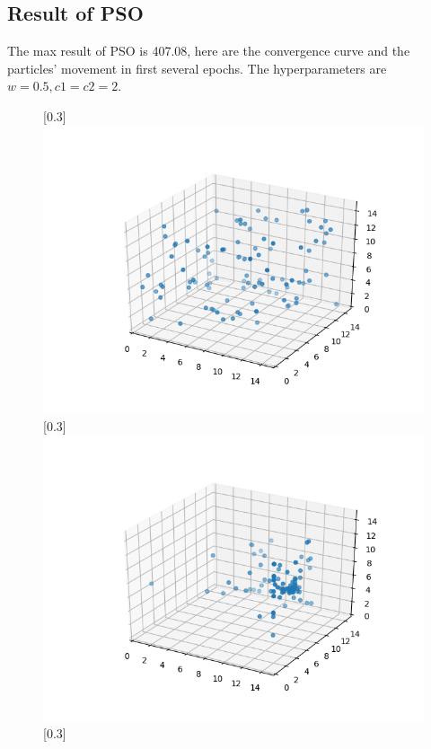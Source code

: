 \documentclass[11pt]{article} %
\begin{document}
\subsection{Result of PSO}
The max result of PSO is 407.08, here are the convergence curve and the particles' movement in first several epochs. The hyperparameters are $w = 0.5, c1=c2=2$.
\begin{figure}[ht]
		\centering
	[0.3\linewidth]{
		\includegraphics[scale=0.3]{PSO01.png}
	}
	[0.3\linewidth]{
		\includegraphics[scale=0.3]{PSO02.png}
	}
	[0.3\linewidth]{
}
\end{figure}
\end{document}
